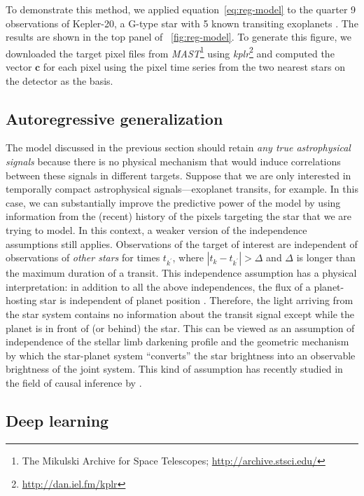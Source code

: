 \documentclass[letterpaper,12pt,whitepaper]{haastex}
\newcommand{\project}[1]{\textsl{#1}}
\newcommand{\MAST}{\project{MAST}}
\newcommand{\kplr}{\project{kplr}}
\begin{document}
To demonstrate this method, we applied equation~\ref{eq:reg-model} to the
quarter 9 observations of Kepler-20, a G-type star with 5 known transiting
exoplanets \citep{kepler20}.
The results are shown in the top panel of \figurename~\ref{fig:reg-model}.
To generate this figure, we downloaded the target pixel files from
\MAST\footnote{The Mikulski Archive for Space Telescopes;
\url{http://archive.stsci.edu/}} using
\kplr\footnote{\url{http://dan.iel.fm/kplr}}
and computed the vector $\mathbf{c}$ for each pixel using the pixel time
series from the two nearest stars on the detector as the basis.

\subsection{Autoregressive generalization}
The model discussed in the previous section should retain \emph{any true
astrophysical signals} because there is no physical mechanism that would
induce correlations between these signals in different targets.
Suppose that we are only interested in temporally compact astrophysical
signals---exoplanet transits, for example.
In this case, we can substantially improve the predictive power of the model
by using information from the (recent) history of the pixels targeting the star
that we are trying to model.
In this context, a weaker version of the independence assumptions still
applies.
Observations of the target of interest are independent of observations of
\emph{other stars} for times $t_{k^\prime}$, where $|t_k - t_{k^\prime}| >
\Delta$ and $\Delta$ is longer than the maximum duration of a transit.
This independence assumption has a physical interpretation: in addition
to all the above independences, the flux of a planet-hosting star is
independent of planet position \citep[except in rare cases of close-in planets
that produce phase variations,][]{esteves2013}. Therefore, the light arriving
from the star system contains no information about the transit signal except
while the planet is in front of (or behind) the star.
This can be viewed as an assumption of independence of the stellar limb
darkening profile and the geometric mechanism by which the
star-planet system ``converts'' the star brightness into an observable
brightness of the joint system.
This kind of assumption has recently studied in the field of causal inference
by \citet{JanSch10}.

\subsection{Deep learning}\label{sec:deep}
\end{document}
